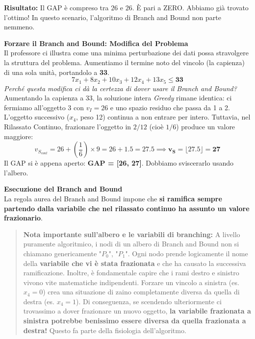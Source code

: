 \documentclass[12pt, a4paper]{article}
\newcommand{\separatore}{\noindent{\color{titlecolor!50}\rule{\textwidth}{0.6pt}}}
\begin{document}
	\textbf{Risultato:} Il GAP è compreso tra $26$ e $26$. È pari a ZERO. Abbiamo già trovato l'ottimo! In questo scenario, l'algoritmo di Branch and Bound non parte nemmeno.
	
	\vspace{0.6cm}
	\separatore
	\vspace{0.4cm}
	
	\textbf{Forzare il Branch and Bound: Modifica del Problema}\\
	Il professore ci illustra come una minima perturbazione dei dati possa stravolgere la struttura del problema. Aumentiamo il termine noto del vincolo (la capienza) di una sola unità, portandolo a \textbf{33}.
	\[
	7x_1 + 8x_2 + 10x_3 + 12x_4 + 13x_5 \leq \mathbf{33}
	\]
	\textit{Perché questa modifica ci dà la certezza di dover usare il Branch and Bound?} 
	Aumentando la capienza a 33, la soluzione intera \textit{Greedy} rimane identica: ci fermiamo all'oggetto 3 con $v_I = 26$ e uno spazio residuo che passa da 1 a 2. L'oggetto successivo ($x_4$, peso 12) continua a non entrare per intero. 
	Tuttavia, nel Rilassato Continuo, frazionare l'oggetto in $2/12$ (cioè $1/6$) produce un valore maggiore:
	\[
	v_{S_{cont}} = 26 + \left(\frac{1}{6}\right) \times 9 = 26 + 1.5 = 27.5 \implies \mathbf{v_S = \lfloor 27.5 \rfloor = 27}
	\]
	Il GAP si è appena aperto: \textbf{GAP = [26, 27]}. Dobbiamo sviscerarlo usando l'albero.
	
	\vspace{0.4cm}
	\textbf{Esecuzione del Branch and Bound}\\
	La regola aurea del Branch and Bound impone che \textbf{si ramifica sempre partendo dalla variabile che nel rilassato continuo ha assunto un valore frazionario}. 
	
	\begin{quote}
		\textbf{Nota importante sull'albero e le variabili di branching:} 
		A livello puramente algoritmico, i nodi di un albero di Branch and Bound non si chiamano genericamente "$P_0$", "$P_1$". Ogni nodo prende logicamente il nome della \textbf{variabile che vi è stata frazionata} e che ha causato la successiva ramificazione.
		Inoltre, è fondamentale capire che i rami destro e sinistro vivono vite matematiche indipendenti. Forzare un vincolo a sinistra (es. $x_4=0$) crea una situazione di zaino completamente diversa da quella di destra (es. $x_4=1$). Di conseguenza, se scendendo ulteriormente ci trovassimo a dover frazionare un nuovo oggetto, \textbf{la variabile frazionata a sinistra potrebbe benissimo essere diversa da quella frazionata a destra!} Questo fa parte della fisiologia dell'algoritmo.
	\end{quote}
	
\end{document}
